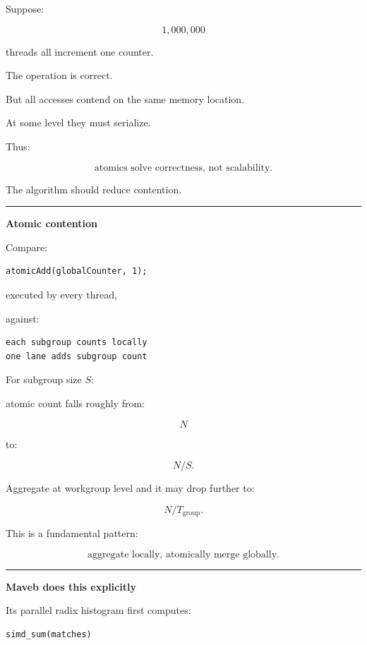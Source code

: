 Suppose:

\[
1,000,000
\]

threads all increment one counter.

The operation is correct.

But all accesses contend on the same memory location.

At some level they must serialize.

Thus:

\[
\boxed{
\text{atomics solve correctness, not scalability}.
}
\]

The algorithm should reduce contention.

\begin{center}\rule{0.5\linewidth}{0.5pt}\end{center}

\textbf{Atomic contention}

Compare:

\protect{}\label{3nct9g}%
\begin{verbatim}
atomicAdd(globalCounter, 1);
\end{verbatim}

executed by every thread,

against:

\protect{}\label{oah6qe}%
\begin{verbatim}
each subgroup counts locally
one lane adds subgroup count
\end{verbatim}

For subgroup size \(S\):

atomic count falls roughly from:

\[
N
\]

to:

\[
N/S.
\]

Aggregate at workgroup level and it may drop further to:

\[
N/T_{\text{group}}.
\]

This is a fundamental pattern:

\[
\boxed{
\text{aggregate locally, atomically merge globally}.
}
\]

\begin{center}\rule{0.5\linewidth}{0.5pt}\end{center}

\textbf{Maveb does this explicitly}

Its parallel radix histogram first computes:

\protect{}\label{l7udrw}%
\begin{verbatim}
simd_sum(matches)
\end{verbatim}


